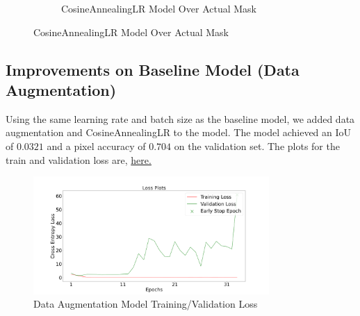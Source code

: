 \documentclass{article}
\begin{document}
\begin{figure}[h!]
\begin{subfigure}[b]{0.45\textwidth}
      \caption{CosineAnnealingLR Model Over Actual Mask}
      \label{fig:cosine_over_actual}
  \end{subfigure}
  \label{fig:cossine_annealing_masks_visualization}
\end{figure}

\subsection{Improvements on Baseline Model (Data Augmentation)}
Using the same learning rate and batch size as the baseline model, we added data augmentation and CosineAnnealingLR to the model. The model achieved an IoU of $0.0321$ and a pixel accuracy of $0.704$ on the validation set. The plots for the train and validation loss are, \hyperref[fig:data_augmentation_train_loss]{here.}

\begin{figure}[h!]
  \centering
  \includegraphics[width=0.8\textwidth]{include/plots/train_4_b_loss.png}
  \caption{Data Augmentation Model Training/Validation Loss}
  \label{fig:data_augmentation_train_loss}
\end{figure}
\end{document}
